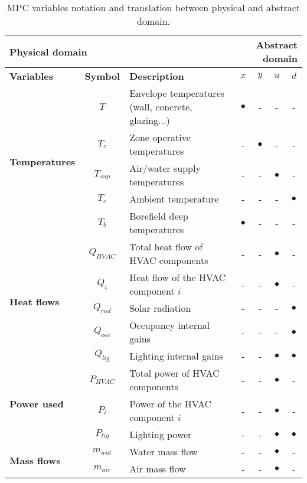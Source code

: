 \documentclass[10pt]{extarticle}
\begin{document}
\begin{table}[h]
	\centering
	\caption{MPC variables notation and translation between physical and abstract domain.}
	\label{tab:mpc_form:translation}
	\begin{tabular}{l|c|l|cccc}
		\toprule
		\multicolumn{3}{l}{\textbf{Physical domain}} &  \multicolumn{4}{r}{\textbf{Abstract domain}} \\
		\toprule
		\textbf{Variables} & \textbf{Symbol} & \textbf{Description} & \textbf{$x$} & \textbf{$y$} & \textbf{$u$} & \textbf{$d$} \\ 
		\midrule
		\multirow{5}{*}{\textbf{Temperatures}} & $T$ & Envelope temperatures (wall, concrete, glazing...) & $\bullet$ & - & - & - \\ 
		& $T_z$ & Zone operative temperatures & - & $\bullet$ & - & - \\
		& $T_{sup}$ & Air/water supply temperatures &  - & - & $\bullet$ & - \\
		& $T_e$ & Ambient temperature &  - & - & - & $\bullet$ \\
		& $T_b$ & Borefield deep temperatures & $\bullet$ & - & - & - \\
		\midrule
		\multirow{5}{*}{\textbf{Heat flows}} &
		$Q_{HVAC}$ & Total heat flow of HVAC components & - & - & $\bullet$ & - \\
		& $Q_{i}$ & Heat flow of the HVAC component $i$ & - & - &  $\bullet$ &- \\
		& $Q_{rad}$ & Solar radiation & - & - & - & $\bullet$ \\
		& $Q_{occ}$ & Occupancy internal gains & - & - & - & $\bullet$ \\
		& $Q_{lig}$ & Lighting internal gains & - & - & $\bullet$ & $\bullet$ \\
		\midrule
		\multirow{3}{*}{\textbf{Power used}} &
		$P_{HVAC}$ & Total power of HVAC components & - & - & $\bullet$ & - \\
		& $P_{i}$ & Power of the HVAC component $i$ & - & - &  $\bullet$ &- \\
		& $P_{lig}$ & Lighting power & - & - & $\bullet$ & $\bullet$ \\
\midrule
		\multirow{2}{*}{\textbf{Mass flows}} &
		$m_{wat}$ & Water mass flow & - & - & $\bullet$ & - \\
		& $m_{air}$ & Air mass flow & - & - & $\bullet$ & - \\

\end{tabular}
\end{table}
\end{document}
